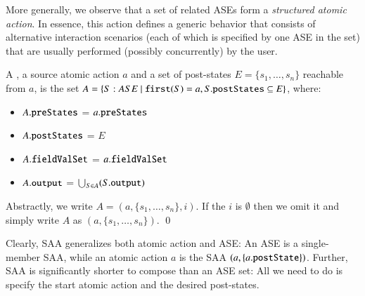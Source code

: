 More generally, we observe that a set of related ASEs form a \textit{structured atomic action}. In essence, this action defines a generic behavior that consists of alternative interaction scenarios (each of which is specified by one ASE in the set) that are usually performed (possibly concurrently) by the user.

\begin{definition} \label{def:saa}
	A , \wrt a source atomic action $ a $ and a set of post-states $ E = \{ s_{1},\dots,s_{n} \} $ reachable from $a$, is the set $ A = \{S: ASE ~|~ \func{first}(S) = a, S.\attribn{postStates} \subseteq E \} $, where:
	\begin{itemize}
		\item $A.{\tt preStates}$ = $a.{\tt preStates}$
		\item $A.{\tt postStates}$ = $E$
		\item $A.{\tt fieldValSet}$ = $a.{\tt fieldValSet}$
		\item $A.{\tt output}$ = $\bigcup_{S \in A} (S.{\tt output})$
	\end{itemize}
	
	Abstractly, we write $ A = (a, \{ s_{1},\dots,s_{n} \}, i) $. If the  $i$ is $\emptyset$ then we omit it and simply write $A$ as $(a, \{ s_{1},\dots,s_{n} \})$. \qed
\end{definition}

Clearly, SAA generalizes both atomic action and ASE: An ASE is a single-member SAA, while an atomic action $ a $ is the SAA 
%
$ (a, \{ a.{\tt postState} \}) $.
%
Further, SAA is significantly shorter to compose than an ASE set: All we need to do is specify the start atomic action and the desired post-states.


